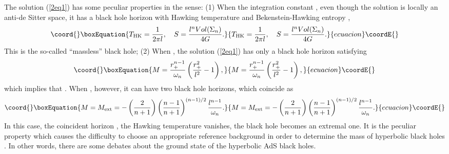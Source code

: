 \documentclass[a4paper,12pt]{article}
\begin{document}
The solution (\ref{2eq1}) has some peculiar properties in the sense: 
(1) When the integration constant \coordHE{}, even though the solution
is locally an anti-de Sitter space, it has a black hole horizon \coordHE{}
with Hawking temperature \coordHE{} and Bekenstein-Hawking entropy \coordHE{}, 
\begin{equation}\coord{}\boxEquation{
\label{2eq3}
T_{\rm HK}= \frac{1}{2\pi l}, \ \ \  S =\frac{l^n Vol(\Sigma_n)}{4G}.
}{
T_{\rm HK}= \frac{1}{2\pi l}, \ \ \  S =\frac{l^n Vol(\Sigma_n)}{4G}.
}{ecuacion}\coordE{}\end{equation}
This is the so-called ``massless'' black hole;  (2) When \coordHE{}, the solution
(\ref{2eq1}) has only a black hole horizon satisfying
\begin{equation}\coord{}\boxEquation{
\label{2eq4}
M =\frac{r_+^{n-1}}{\omega_n}\left (\frac{r_+^2}{l^2}-1\right ),
}{
M =\frac{r_+^{n-1}}{\omega_n}\left (\frac{r_+^2}{l^2}-1\right ),
}{ecuacion}\coordE{}\end{equation}
which implies that \coordHE{}.  When \coordHE{}, however, it can have two black hole
horizons, which coincide as 
\begin{equation}\coord{}\boxEquation{
\label{2eq5}
M =M_{\rm ext}= -\left (\frac{2}{n+1}\right)
   \left (\frac{n-1}{n+1}\right)^{(n-1)/2} \frac{l^{n-1}}{\omega_n}.
}{
M =M_{\rm ext}= -\left (\frac{2}{n+1}\right)
   \left (\frac{n-1}{n+1}\right)^{(n-1)/2} \frac{l^{n-1}}{\omega_n}.
}{ecuacion}\coordE{}\end{equation}
In this case, the coincident horizon \coordHE{}, the Hawking
temperature vanishes, the black hole becomes an extremal one. It is the
peculiar property which causes the difficulty to choose an appropriate 
reference background in order to determine
the mass of hyperbolic black holes \cite{Birm,Emp}. In other words, there 
are some debates about the ground state of the hyperbolic AdS black holes.
\end{document}
